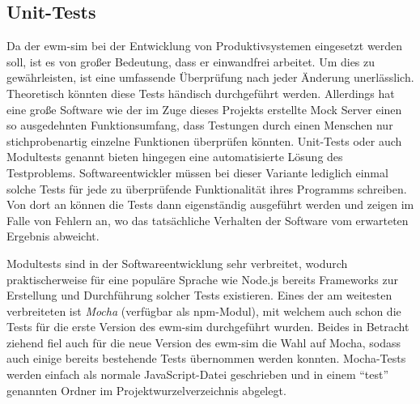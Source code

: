 

\subsection{Unit-Tests}
Da der \ac{ewm-sim} bei der Entwicklung von Produktivsystemen eingesetzt werden soll, ist es von großer Bedeutung, dass er einwandfrei arbeitet.
Um dies zu gewährleisten, ist eine umfassende Überprüfung nach jeder Änderung unerlässlich.
Theoretisch könnten diese Tests händisch durchgeführt werden.
Allerdings hat eine große Software wie der im Zuge dieses Projekts erstellte Mock Server einen so ausgedehnten Funktionsumfang, dass Testungen durch einen Menschen nur stichprobenartig einzelne Funktionen überprüfen könnten.
Unit-Tests oder auch Modultests genannt bieten hingegen eine automatisierte Lösung des Testproblems.
Softwareentwickler müssen bei dieser Variante lediglich einmal solche Tests für jede zu überprüfende Funktionalität ihres Programms schreiben.
Von dort an können die Tests dann eigenständig ausgeführt werden und zeigen im Falle von Fehlern an, wo das tatsächliche Verhalten der Software vom erwarteten Ergebnis abweicht.

Modultests sind in der Softwareentwicklung sehr verbreitet, wodurch praktischerweise für eine populäre Sprache wie Node.js bereits Frameworks zur Erstellung und Durchführung solcher Tests existieren.
Eines der am weitesten verbreiteten ist \emph{Mocha} (verfügbar als \ac{npm}-Modul), mit welchem auch schon die Tests für die erste Version des \ac{ewm-sim} durchgeführt wurden.
Beides in Betracht ziehend fiel auch für die neue Version des \ac{ewm-sim} die Wahl auf Mocha, sodass auch einige bereits bestehende Tests übernommen werden konnten.
Mocha-Tests werden einfach als normale JavaScript-Datei geschrieben und in einem \enquote{test} genannten Ordner im Projektwurzelverzeichnis abgelegt.~\cite{mocha}

